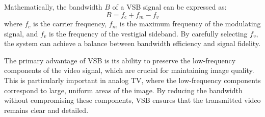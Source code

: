 Mathematically, the bandwidth \( B \) of a VSB signal can be expressed as:
\[ B = f_c + f_m - f_v \]
where \( f_c \) is the carrier frequency, \( f_m \) is the maximum frequency of the modulating signal, and \( f_v \) is the frequency of the vestigial sideband. By carefully selecting \( f_v \), the system can achieve a balance between bandwidth efficiency and signal fidelity.

The primary advantage of VSB is its ability to preserve the low-frequency components of the video signal, which are crucial for maintaining image quality. This is particularly important in analog TV, where the low-frequency components correspond to large, uniform areas of the image. By reducing the bandwidth without compromising these components, VSB ensures that the transmitted video remains clear and detailed.

